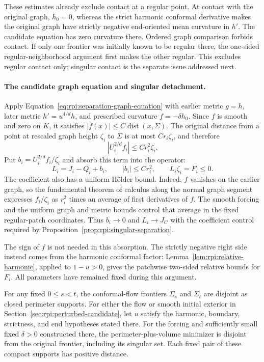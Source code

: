 These estimates already exclude contact at a regular point. At contact with
the original graph, $h_0=0$, whereas the strict harmonic conformal
derivative makes the original graph have strictly negative
end-oriented mean curvature in $h'$. The candidate equation has
zero curvature there. Ordered graph comparison forbids contact.
If only one frontier was initially known to be regular there, the
one-sided regular-neighborhood argument first makes the other
regular. This excludes regular contact only; singular contact is
the separate issue addressed next.

\paragraph{The candidate graph equation and singular detachment.}
Apply Equation~\eqref{eq:rpi:separation-graph-equation} with earlier
metric $g=h$, later metric $h'=u^{4/d}h$, and prescribed curvature
$f=-\delta h_0$. Since $f$ is smooth and zero on $K$, it satisfies
$|f(x)|\le C\operatorname{dist}(x,\Sigma)$. The original distance
from a point at rescaled graph height $\zeta_i$ to $\Sigma$ is at
most $Cr_i\zeta_i$, and therefore
\[
 |U_i^{2/d}f_i|\le Cr_i^2\zeta_i.
\]
Put $b_i=U_i^{2/d}f_i/\zeta_i$ and absorb this term into the operator:
\[
 L_i=J_i-Q_i+b_i,\qquad |b_i|\le Cr_i^2,
 \qquad L_i\zeta_i=F_i\le0.
\]
The coefficient also has a uniform H\"older bound. Indeed, $f$ vanishes
on the earlier graph, so the fundamental theorem of calculus along
the normal graph segment expresses $f_i/\zeta_i$ as $r_i^2$ times
an average of first derivatives of $f$. The smooth forcing and the
uniform graph and metric bounds control that average in the fixed
regular-patch coordinates. Thus $b_i\to0$ and $L_i\to J_C$ with
the coefficient control required by
Proposition~\ref{prop:rpi:singular-separation}.

The sign of $f$ is not needed in this absorption. The strictly
negative right side instead comes from the harmonic conformal factor:
Lemma~\ref{lem:rpi:relative-harmonic}, applied to $1-u>0$, gives the
patchwise two-sided relative bounds for $F_i$. All parameters have
remained fixed during this argument.

\begin{corollary}
\label{cor:rpi:flow-detachment}
For any fixed $0\le s<t$, the conformal-flow frontiers
$\Sigma_s$ and $\Sigma_t$ are disjoint as closed perimeter supports.
For either the flow or smooth initial exterior in
Section~\ref{sec:rpi:perturbed-candidate}, let $u$ satisfy the
harmonic, boundary, strictness, and end hypotheses stated there. For the forcing and
sufficiently small fixed $\delta>0$ constructed there, the
perimeter-plus-volume minimizer is disjoint from the original
frontier, including its singular set. Each fixed pair of these
compact supports has positive distance.
\end{corollary}

